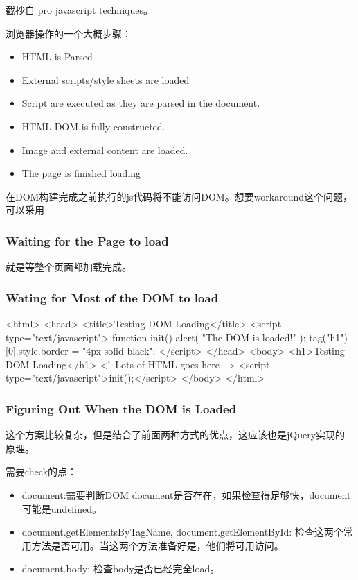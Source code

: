 截抄自 pro javascript techniques。

浏览器操作的一个大概步骤：
\begin{itemize}
\item HTML is Parsed
\item External scripts/style sheets are loaded
\item Script are executed as they are parsed in the document.
\item HTML DOM is fully constructed.
\item Image and external content are loaded.
\item The page is finished loading
\end{itemize}

在DOM构建完成之前执行的js代码将不能访问DOM。想要workaround这个问题，可以采用

\subsubsection{Waiting for the Page to load}

就是等整个页面都加载完成。

\begin{JavaScript}[]

\end{JavaScript}

\subsubsection{Wating for Most of the DOM to load}

\begin{HTML5}
<html>
<head>
<title>Testing DOM Loading</title>
<script type="text/javascript">
function init() {
	alert( "The DOM is loaded!" );
	tag("h1")[0].style.border = "4px solid black";
}
</script>
</head>
<body>
<h1>Testing DOM Loading</h1>
<!--Lots of HTML goes here -->
<script type="text/javascript">init();</script>
</body>
</html>
\end{HTML5}
\subsubsection{Figuring Out When the DOM is Loaded}
这个方案比较复杂，但是结合了前面两种方式的优点，这应该也是jQuery实现的原理。

需要check的点：
\begin{itemize}
\item document:需要判断DOM document是否存在，如果检查得足够快，document可能是undefined。
\item document.getElementsByTagName, document.getElementById: 检查这两个常用方法是否可用。当这两个方法准备好是，他们将可用访问。
\item document.body: 检查body是否已经完全load。
\end{itemize}

